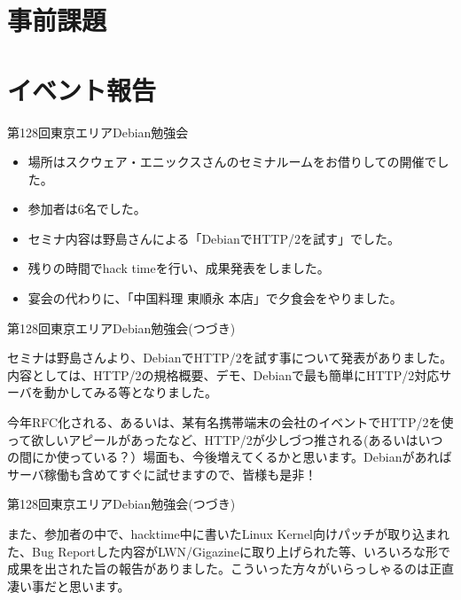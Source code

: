 \section{事前課題}
{\footnotesize

}

\section{イベント報告}

\begin{frame}{第128回東京エリアDebian勉強会}

\begin{itemize}
\item 場所はスクウェア・エニックスさんのセミナルームをお借りしての開催でした。
\item 参加者は6名でした。
\item セミナ内容は野島さんによる「DebianでHTTP/2を試す」でした。
\item 残りの時間でhack timeを行い、成果発表をしました。
\item 宴会の代わりに、「中国料理 東順永 本店」で夕食会をやりました。
\end{itemize} 
  
\end{frame}

\begin{frame}{第128回東京エリアDebian勉強会(つづき)}

  セミナは野島さんより、DebianでHTTP/2を試す事について発表がありました。内容としては、HTTP/2の規格概要、デモ、Debianで最も簡単にHTTP/2対応サーバを動かしてみる等となりました。

  今年RFC化される、あるいは、某有名携帯端末の会社のイベントでHTTP/2を使って欲しいアピールがあったなど、HTTP/2が少しづつ推される(あるいはいつの間にか使っている？）場面も、今後増えてくるかと思います。Debianがあればサーバ稼働も含めてすぐに試せますので、皆様も是非！

\end{frame}

\begin{frame}{第128回東京エリアDebian勉強会(つづき)}

  また、参加者の中で、hacktime中に書いたLinux Kernel向けパッチが取り込まれた、Bug Reportした内容がLWN/Gigazineに取り上げられた等、いろいろな形で成果を出された旨の報告がありました。こういった方々がいらっしゃるのは正直凄い事だと思います。

\end{frame}

